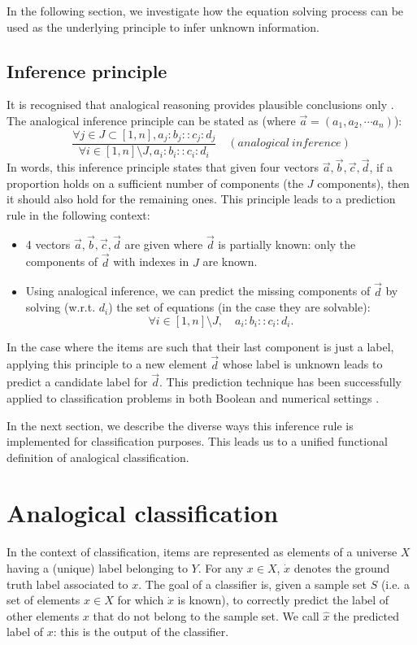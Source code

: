 \documentclass{ecai}
\begin{document}
In the following section, we investigate how the equation solving process can
be used as the underlying principle to infer unknown information.

\subsection{Inference principle}

It is recognised that analogical reasoning provides plausible conclusions
only \cite{DavRus1987}.  The analogical inference principle can be stated as
\cite{StrYvoReport2005} (where $\vec{a} = (a_1, a_2, \cdots a_n)$):
$$\frac{\forall j \in J \subset [1, n],
a_j:b_j::c_j:d_j}{\forall i \in [1,n] \setminus J, a_i:b_i::c_i:d_i} \quad
(analogical ~ inference)$$
\noindent
In words, this inference principle states that given four vectors
$\vec{a},\vec{b},\vec{c}, \vec{d}$, if a proportion holds on a sufficient
number of components (the $J$ components), then it should also hold for the
remaining ones.
This principle leads to a prediction rule in the following context:
\begin{itemize}
\item 4 vectors $\vec{a},\vec{b},\vec{c},
\vec{d}$ are given where $\vec{d}$ is partially known: only the
components of $\vec{d}$ with indexes in $J$ are known.
\item Using analogical inference, we can
predict the missing components of $\vec{d}$ by solving (w.r.t. $d_i$) the set of
equations (in the case they are solvable): $$\forall i \in [1,n]
\setminus J, \quad a_i:b_i::c_i:d_i.$$
\end{itemize}
In the case where the items are such that their last component is just a label,
applying this principle to a new element $\vec{d}$ whose label is
unknown leads to predict a candidate label for $\vec{d}$. This prediction
technique has been successfully applied to classification problems in both
Boolean \cite{BayMicDel2007,BouPraRicECAI2014} and numerical settings
\cite{PraRicYaoIJCISIM2012}.

In the next section, we describe the diverse ways this
inference rule is implemented for classification purposes. This
leads us to a unified functional definition of analogical
classification.

\section{Analogical classification}
\label{ANALOGICAL_CLASSIFICATION}
In the context of  classification, items are represented as elements of a universe $X$ having a (unique) label belonging
to $Y$. For any $x\in X$, $\dot{x}$ denotes the ground
truth label associated to $x$. The goal of a classifier is, given a sample
set $S$ (i.e. a set of elements $x \in X$ for which $\dot{x}$ is known), to
correctly predict the label of other elements $x$ that do not belong to the
sample set. We call $\hat{x}$ the predicted label of $x$: this is the output of the classifier.
\end{document}
